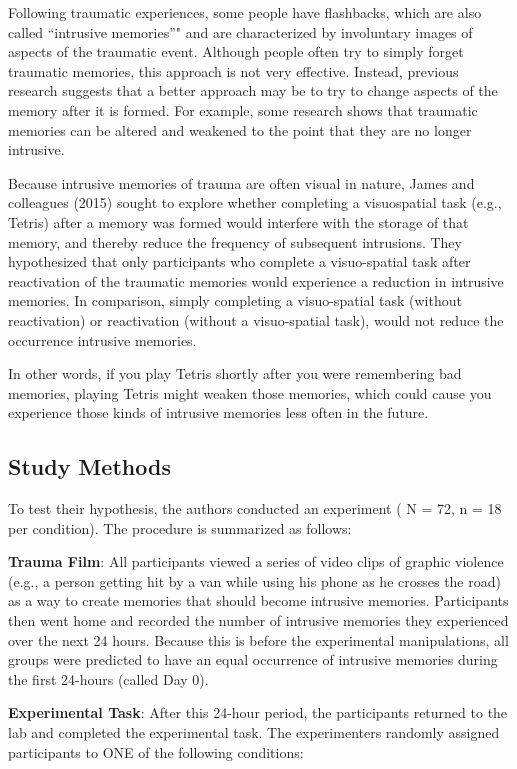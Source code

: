 \documentclass[]{book}
\theoremstyle{definition}
\theoremstyle{definition}
\theoremstyle{definition}
\theoremstyle{remark}
\begin{document}
Following traumatic experiences, some people have flashbacks, which are
also called ``intrusive memories''" and are characterized by involuntary
images of aspects of the traumatic event. Although people often try to
simply forget traumatic memories, this approach is not very effective.
Instead, previous research suggests that a better approach may be to try
to change aspects of the memory after it is formed. For example, some
research shows that traumatic memories can be altered and weakened to
the point that they are no longer intrusive.

Because intrusive memories of trauma are often visual in nature, James
and colleagues (2015) sought to explore whether completing a
visuospatial task (e.g., Tetris) after a memory was formed would
interfere with the storage of that memory, and thereby reduce the
frequency of subsequent intrusions. They hypothesized that only
participants who complete a visuo-spatial task after reactivation of the
traumatic memories would experience a reduction in intrusive memories.
In comparison, simply completing a visuo-spatial task (without
reactivation) or reactivation (without a visuo-spatial task), would not
reduce the occurrence intrusive memories.

In other words, if you play Tetris shortly after you were remembering
bad memories, playing Tetris might weaken those memories, which could
cause you experience those kinds of intrusive memories less often in the
future.

\subsection{Study Methods}\label{study-methods}

To test their hypothesis, the authors conducted an experiment ( N = 72,
n = 18 per condition). The procedure is summarized as follows:

\textbf{Trauma Film}: All participants viewed a series of video clips of
graphic violence (e.g., a person getting hit by a van while using his
phone as he crosses the road) as a way to create memories that should
become intrusive memories. Participants then went home and recorded the
number of intrusive memories they experienced over the next 24 hours.
Because this is before the experimental manipulations, all groups were
predicted to have an equal occurrence of intrusive memories during the
first 24-hours (called Day 0).

\textbf{Experimental Task}: After this 24-hour period, the participants
returned to the lab and completed the experimental task. The
experimenters randomly assigned participants to ONE of the following
conditions:
\end{document}
